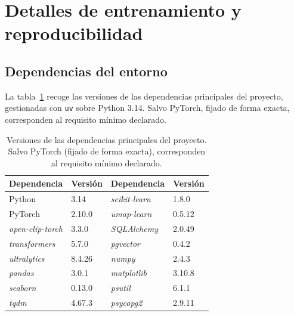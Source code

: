 
\section{Detalles de entrenamiento y reproducibilidad}
\label{anexo:repro}

\subsection{Dependencias del entorno}
La tabla~\ref{tab:dependencias} recoge las versiones de las dependencias
principales del proyecto, gestionadas con \texttt{uv} sobre Python 3.14. Salvo
PyTorch, fijado de forma exacta, corresponden al requisito mínimo declarado.

\begin{table}[h!]
  \centering
  \begin{tabular}{|l|l||l|l|} \hline
    \textbf{Dependencia} & \textbf{Versión} & \textbf{Dependencia} & \textbf{Versión} \\ \hline
    Python           & 3.14    & \textit{scikit-learn} & 1.8.0   \\ \hline
    PyTorch          & 2.10.0  & \textit{umap-learn}   & 0.5.12  \\ \hline
    \textit{open-clip-torch} & 3.3.0 & \textit{SQLAlchemy} & 2.0.49 \\ \hline
    \textit{transformers}    & 5.7.0 & \textit{pgvector}   & 0.4.2  \\ \hline
    \textit{ultralytics}     & 8.4.26 & \textit{numpy}     & 2.4.3  \\ \hline
    \textit{pandas}  & 3.0.1   & \textit{matplotlib}   & 3.10.8 \\ \hline
    \textit{seaborn} & 0.13.0  & \textit{psutil}       & 6.1.1  \\ \hline
    \textit{tqdm}    & 4.67.3  & \textit{psycopg2}     & 2.9.11 \\ \hline
  \end{tabular}
  \caption[Versiones de las dependencias principales]{Versiones de las
  dependencias principales del proyecto. Salvo PyTorch (fijado de forma
  exacta), corresponden al requisito mínimo declarado.}
  \label{tab:dependencias}
\end{table}



